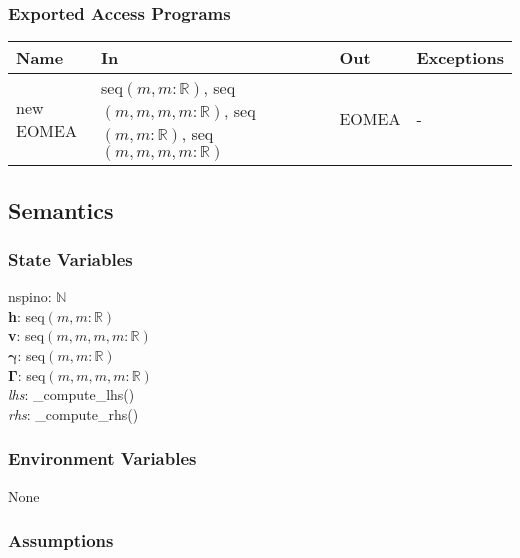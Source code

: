 \documentclass[12pt, titlepage]{article}
\begin{document}
\subsubsection{Exported Access Programs}

\begin{center}
	\begin{tabular}{p{2.3cm} p{4cm} p{4cm} p{2cm}}
		\hline
		\textbf{Name} & \textbf{In} & \textbf{Out} & \textbf{Exceptions} \\
		\hline
		new EOMEA & seq$(m,m:\mathbb{R})$, seq$(m,m,m,m:\mathbb{R})$, 
		seq$(m,m:\mathbb{R})$, seq$(m,m,m,m:\mathbb{R})$& EOMEA & - \\
		\hline
	\end{tabular}
\end{center}

\subsection{Semantics}

\subsubsection{State Variables}
nspino: $\mathbb{N}$\\
\textbf{h}: seq$(m,m:\mathbb{R})$\\
\textbf{v}: seq$(m,m,m,m:\mathbb{R})$\\
$\boldsymbol{\gamma}$: seq$(m,m:\mathbb{R})$\\
$\boldsymbol{\Gamma}$: seq$(m,m,m,m:\mathbb{R})$\\
\textit{lhs}: \_compute\_lhs()\\
\textit{rhs}: \_compute\_rhs()

\subsubsection{Environment Variables}

None

\subsubsection{Assumptions}
\end{document}
